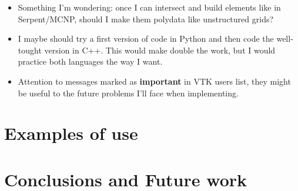 \documentclass{elsarticle}
\begin{document}
\begin{itemize}

    \item Something I'm wondering: once I can intersect and build elements like in Serpent/MCNP, should I make
      them polydata like unstructured grids?
    \item I maybe should try a first version of code in Python and then code the well-tought version in C++. This would make double the work, but I would practice both languages the way I want.
    \item Attention to messages marked as \textbf{important} in VTK users list, they might be useful to the future problems I'll face when implementing.
      
\end{itemize}

\section{Examples of use}

\section{Conclusions and Future work}



\end{document}
